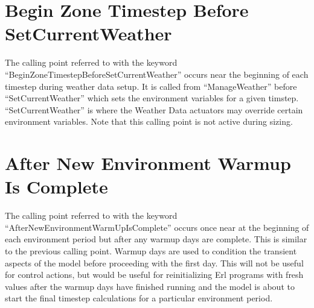 \section{Begin Zone Timestep Before SetCurrentWeather}\label{begin-zone-timestep-before-setcurrentweather}

The calling point referred to with the keyword ``BeginZoneTimestepBeforeSetCurrentWeather'' occurs near the beginning of each timestep during weather data setup. It is called from ``ManageWeather'' before ``SetCurrentWeather'' which sets the environment variables for a given timstep. ``SetCurrentWeather'' is where the Weather Data actuators may override certain environment variables. Note that this calling point is not active during sizing.

\section{After New Environment Warmup Is Complete}\label{after-new-environment-warmup-is-complete}

The calling point referred to with the keyword ``AfterNewEnvironmentWarmUpIsComplete'' occurs once near at the beginning of each environment period but after any warmup days are complete. This is similar to the previous calling point. Warmup days are used to condition the transient aspects of the model before proceeding with the first day. This will not be useful for control actions, but would be useful for reinitializing Erl programs with fresh values after the warmup days have finished running and the model is about to start the final timestep calculations for a particular environment period.
